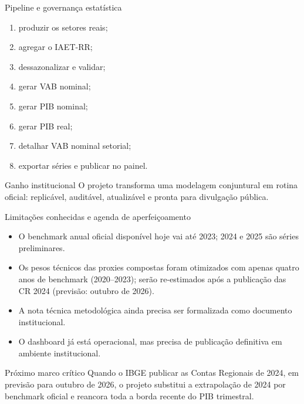 \documentclass[aspectratio=169,11pt]{beamer}
\begin{document}
\begin{frame}{Pipeline e governança estatística}
\begin{enumerate}
  \item produzir os setores reais;
  \item agregar o IAET-RR;
  \item dessazonalizar e validar;
  \item gerar VAB nominal;
  \item gerar PIB nominal;
  \item gerar PIB real;
  \item detalhar VAB nominal setorial;
  \item exportar séries e publicar no painel.
\end{enumerate}

\begin{block}{Ganho institucional}
O projeto transforma uma modelagem conjuntural em rotina oficial: replicável, auditável, atualizável e pronta para divulgação pública.
\end{block}
\end{frame}

\begin{frame}{Limitações conhecidas e agenda de aperfeiçoamento}
\begin{itemize}
  \item O benchmark anual oficial disponível hoje vai até 2023; 2024 e 2025 são séries preliminares.
  \item Os pesos técnicos das proxies compostas foram otimizados com apenas quatro anos de benchmark (2020--2023); serão re-estimados após a publicação das CR 2024 (previsão: outubro de 2026).
  \item A nota técnica metodológica ainda precisa ser formalizada como documento institucional.
  \item O dashboard já está operacional, mas precisa de publicação definitiva em ambiente institucional.
\end{itemize}

\vspace{0.25cm}
\begin{alertblock}{Próximo marco crítico}
Quando o IBGE publicar as Contas Regionais de 2024, em previsão para outubro de 2026, o projeto substitui a extrapolação de 2024 por benchmark oficial e reancora toda a borda recente do PIB trimestral.
\end{alertblock}
\end{frame}
\end{document}
